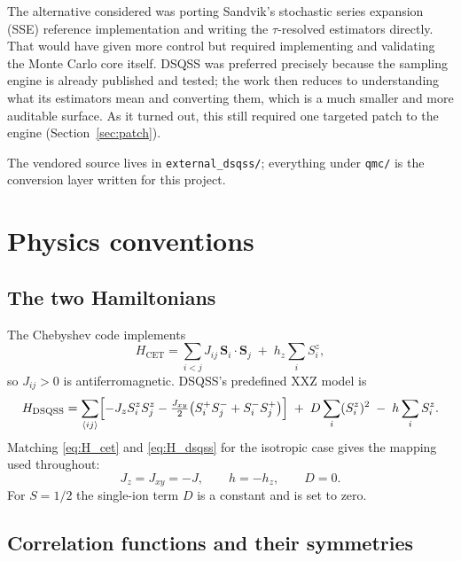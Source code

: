 \documentclass[11pt,a4paper]{article}
\newcommand{\Sp}{S^{+}}
\newcommand{\Sm}{S^{-}}
\newcommand{\code}[1]{\texttt{#1}}
\begin{document}
The alternative considered was porting Sandvik's stochastic series expansion
(SSE) reference implementation and writing the $\tau$-resolved estimators
directly. That would have given more control but required implementing and
validating the Monte Carlo core itself. DSQSS was preferred precisely because
the sampling engine is already published and tested; the work then reduces to
understanding what its estimators mean and converting them, which is a much
smaller and more auditable surface. As it turned out, this still required one
targeted patch to the engine (Section~\ref{sec:patch}).

The vendored source lives in \code{external\_dsqss/}; everything under
\code{qmc/} is the conversion layer written for this project.

\section{Physics conventions}

\subsection{The two Hamiltonians}

The Chebyshev code implements
\begin{equation}
  H_{\text{CET}}
  = \sum_{i<j} J_{ij}\, \mathbf{S}_i\!\cdot\!\mathbf{S}_j
  \;+\; h_z \sum_i S^z_i ,
  \label{eq:H_cet}
\end{equation}
so $J_{ij}>0$ is antiferromagnetic. DSQSS's predefined XXZ model is
\begin{equation}
  H_{\text{DSQSS}}
  = \sum_{\langle ij\rangle}
     \Bigl[ -J_z S^z_i S^z_j
            -\tfrac{J_{xy}}{2}\bigl(\Sp_i \Sm_j + \Sm_i \Sp_j\bigr) \Bigr]
    \;+\; D\sum_i (S^z_i)^2 \;-\; h \sum_i S^z_i .
  \label{eq:H_dsqss}
\end{equation}
Matching \eqref{eq:H_cet} and \eqref{eq:H_dsqss} for the isotropic case gives the
mapping used throughout:
\begin{equation}
  \boxed{\;J_z = J_{xy} = -J, \qquad h = -h_z, \qquad D = 0. \;}
  \label{eq:mapping}
\end{equation}
For $S=1/2$ the single-ion term $D$ is a constant and is set to zero.

\subsection{Correlation functions and their symmetries}
\end{document}
